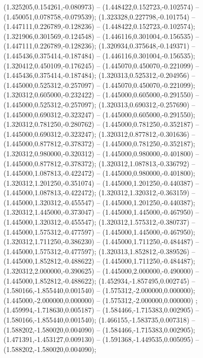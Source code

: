  (1.325205,0.154261,-0.080973) -- (1.448422,0.152723,-0.102574) -- (1.450051,0.078758,-0.079539);
 (1.323328,0.227798,-0.101754) -- (1.447111,0.226789,-0.128236) -- (1.448422,0.152723,-0.102574);
 (1.321906,0.301569,-0.124548) -- (1.446116,0.301004,-0.156535) -- (1.447111,0.226789,-0.128236);
 (1.320934,0.375648,-0.149371) -- (1.445436,0.375414,-0.187484) -- (1.446116,0.301004,-0.156535);
 (1.320412,0.450109,-0.176245) -- (1.445070,0.450070,-0.221099) -- (1.445436,0.375414,-0.187484);
 (1.320313,0.525312,-0.204956) -- (1.445000,0.525312,-0.257097) -- (1.445070,0.450070,-0.221099);
 (1.320312,0.605000,-0.232422) -- (1.445000,0.605000,-0.291550) -- (1.445000,0.525312,-0.257097);
 (1.320313,0.690312,-0.257690) -- (1.445000,0.690312,-0.323247) -- (1.445000,0.605000,-0.291550);
 (1.320312,0.781250,-0.280762) -- (1.445000,0.781250,-0.352187) -- (1.445000,0.690312,-0.323247);
 (1.320312,0.877812,-0.301636) -- (1.445000,0.877812,-0.378372) -- (1.445000,0.781250,-0.352187);
 (1.320312,0.980000,-0.320312) -- (1.445000,0.980000,-0.401800) -- (1.445000,0.877812,-0.378372);
 (1.320312,1.087813,-0.336792) -- (1.445000,1.087813,-0.422472) -- (1.445000,0.980000,-0.401800);
 (1.320312,1.201250,-0.351074) -- (1.445000,1.201250,-0.440387) -- (1.445000,1.087813,-0.422472);
 (1.320312,1.320312,-0.363159) -- (1.445000,1.320312,-0.455547) -- (1.445000,1.201250,-0.440387);
 (1.320312,1.445000,-0.373047) -- (1.445000,1.445000,-0.467950) -- (1.445000,1.320312,-0.455547);
 (1.320312,1.575312,-0.380737) -- (1.445000,1.575312,-0.477597) -- (1.445000,1.445000,-0.467950);
 (1.320312,1.711250,-0.386230) -- (1.445000,1.711250,-0.484487) -- (1.445000,1.575312,-0.477597);
 (1.320313,1.852812,-0.389526) -- (1.445000,1.852812,-0.488622) -- (1.445000,1.711250,-0.484487);
 (1.320312,2.000000,-0.390625) -- (1.445000,2.000000,-0.490000) -- (1.445000,1.852812,-0.488622);
 (1.452934,-1.857495,0.002745) -- (1.580166,-1.855440,0.001540) -- (1.575312,-2.000000,0.000000);
 (1.445000,-2.000000,0.000000) -- (1.575312,-2.000000,0.000000) ;
 (1.459994,-1.718630,0.005187) -- (1.584466,-1.715383,0.002905) -- (1.580166,-1.855440,0.001540);
 (1.466155,-1.583735,0.007318) -- (1.588202,-1.580020,0.004090) -- (1.584466,-1.715383,0.002905);
 (1.471391,-1.453127,0.009130) -- (1.591368,-1.449535,0.005095) -- (1.588202,-1.580020,0.004090);
